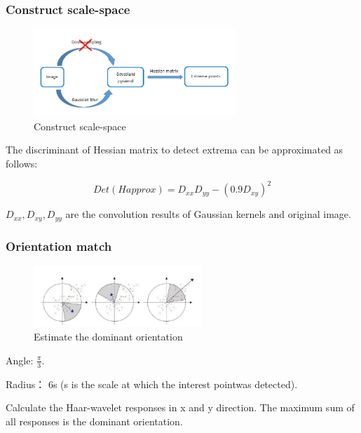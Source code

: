 \documentclass[notheorems, serif, table, compress]{beamer}  %
\begin{document}
\begin{frame}[fragile]
\frametitle{Construct scale-space}

\begin{figure}[!ht]
  \centering\includegraphics[width=3in]{pyramidsurf.png}
  \caption{Construct scale-space}
 \label{step}
  \end{figure}
The discriminant of Hessian matrix to detect extrema can be approximated as follows:

\begin{equation}
Det(Happrox)=D_{xx}D_{yy}-(0.9D_{xy})^{2}
\end{equation}

$D_{xx},D_{xy},D_{yy}$ are the convolution results of Gaussian kernels and original image.
\end{frame}

\begin{frame}[fragile]
\frametitle{Orientation match}%

\begin{figure}[!ht]
  \centering\includegraphics[width=2.5in]{haar.png}
  \caption{Estimate the dominant orientation}
 \label{step}
  \end{figure}

Angle: $\frac{\pi}{3}$.

Radius： 6s (s is the scale at which the interest pointwas detected). 

Calculate the Haar-wavelet responses in x and y direction. The maximum sum of all responses is the dominant orientation.
\end{frame}
\end{document}
